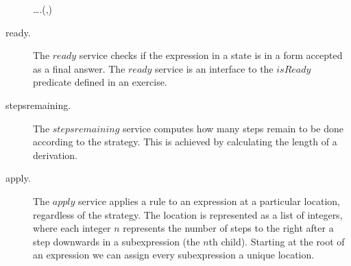 \documentclass[copyright]{eptcs}
\newcommand{\Varid}[1]{\mathit{#1}}
\def\resethooks{\global\let\SaveRestoreHook\empty
  \global\let\ColumnHook\empty}
\begin{document}
\begin{description}
\begin{hscode}
\>[20]{}\forall\;\Varid{i}\;\mathrel{\in}\;\;\ldots\;\Varid{n}\;.\;(,)\mathrel{=}\Varid{onefirst}\;\<[E]\ColumnHook
\end{hscode}\resethooks
\item[ready.]
The \ensuremath{\Varid{ready}} service checks if the expression in a state is in a form accepted as
a final answer. The \ensuremath{\Varid{ready}} service is an interface to the \ensuremath{\Varid{isReady}} predicate
defined in an exercise.

\item[stepsremaining.]
The \ensuremath{\Varid{stepsremaining}} service computes how many steps remain to be done according
to the strategy. This is achieved by calculating the length of a derivation.

\item[apply.]
The \ensuremath{\Varid{apply}} service applies a rule to an expression at a particular location,
regardless of the strategy. The location is represented as a list of integers,
where each integer \ensuremath{\Varid{n}} represents the number of steps to the right after a step
downwards in a subexpression (the \ensuremath{\Varid{n}}th child). Starting at the root of an
expression we can assign every subexpression a unique location.


\end{description}
\end{document}
